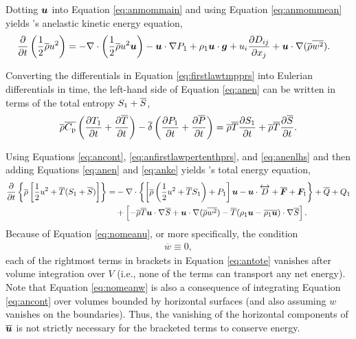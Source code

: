 \documentclass[12pt]{article}
\newcommand{\vecf}{\bm{F}}
\newcommand{\uover}{{\overline{\vecu}}}
\begin{document}
  
Dotting $\bm{u}$ into Equation \eqref{eq:anmommain} and using Equation \eqref{eq:anmommean} yields \citet{Gough1969}'s anelastic kinetic energy equation,
	\begin{align}\label{eq:anke}
		\frac{\partial}{\partial t}\left(\frac{1}{2}\overline{\rho} u^2\right)&=-\nabla\cdot\left(\frac{1}{2}\overline{\rho} u^2\bm{u} \right) - \bm{u}\cdot\nabla P_1 + \rho_1\bm{u}\cdot\bm{g} + u_i\frac{\partial D_{ij}}{\partial x_j} + \bm{u}\cdot\nabla(\overline{\rho} \overline{w^2}).
	\end{align}

Converting the differentials in Equation \eqref{eq:firstlawtmpprs} into Eulerian differentials in time, the left-hand side of Equation \eqref{eq:anen} can be written in terms of the total entropy $S_1 + \overline{S}$, 
\begin{align}\label{eq:anenlhs}
	\overline{\rho}\overline{C_{\rm{p}}}\left(\frac{\partial T_1}{\partial t}+\frac{\partial\overline{T}}{\partial t}\right)- \overline{\delta}\left(\frac{\partial P_1}{\partial t} + \frac{\partial\overline{P}}{\partial t}\right) = \overline{\rho}\overline{T}\frac{\partial S_1}{\partial t} +  \overline{\rho}\overline{T}\frac{\partial\overline{S}}{\partial t}.
\end{align}

Using Equations \eqref{eq:ancont}, \eqref{eq:anfirstlawpertenthprs}, and \eqref{eq:anenlhs} and then adding Equations \eqref{eq:anen} and \eqref{eq:anke} yields \citet{Gough1969}'s total energy equation,
\begin{align}\label{eq:antote}
			\pderiv{}{t}\left\{\rhoover\left[\frac{1}{2} u^2 + \tmpover (\entrone+\entrover)\right]\right\} = &-\Div\left\{\left[\rhoover\left(\frac{1}{2} u^2 + \tmpover \entrone\right) + \prsone\right]\vecu- \vecu\cdot\overleftrightarrow{D} + \overline{\vecf} + \vecf_1\right\}+ \heatover + Q_1 \nonumber\\
			 &+\left[-\rhoover\tmpover\ugrad\entrover +\ugrad (\rhoover \overline{w^2})- \tmpover(\rhoone\vecu-\overline{\rhoone\vecu})\cdot\nabla\entrover\right].
\end{align}
Because of Equation \eqref{eq:nomeanu}, or more specifically, the condition
\begin{align}\label{eq:nomeanw}
	\overline{w}\equiv0,
\end{align}
 each of the rightmost terms in brackets in Equation \eqref{eq:antote} vanishes after volume integration over $V$ (i.e., none of the terms can transport any net energy). Note that Equation \eqref{eq:nomeanw} is also a consequence of integrating Equation \eqref{eq:ancont} over volumes bounded by horizontal surfaces (and also assuming $w$ vanishes on the boundaries). Thus, the vanishing of the horizontal components of $\uover$ is not strictly necessary for the bracketed terms to conserve energy. 
 
\end{document}
